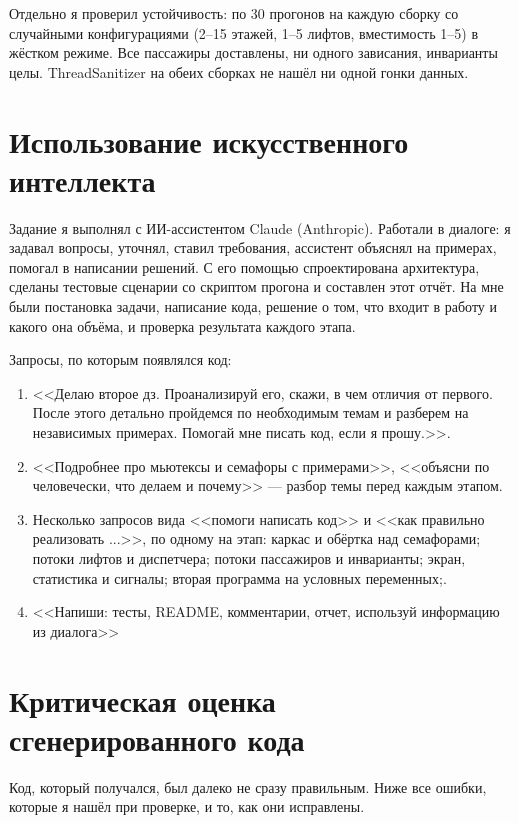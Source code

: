 \documentclass[12pt,a4paper]{article}
\begin{document}
Отдельно я проверил устойчивость: по 30 прогонов на каждую сборку со
случайными конфигурациями (2--15 этажей, 1--5 лифтов, вместимость 1--5) в
жёстком режиме. Все пассажиры доставлены, ни одного зависания, инварианты
целы. ThreadSanitizer на обеих сборках не нашёл ни одной гонки данных.

\section{Использование искусственного интеллекта}

Задание я выполнял с ИИ-ассистентом Claude (Anthropic). Работали в
диалоге: я задавал вопросы, уточнял, ставил требования, ассистент объяснял на примерах, помогал в написании решений. С его помощью спроектирована архитектура, сделаны тестовые сценарии со скриптом прогона
и составлен этот отчёт. На мне были постановка задачи, написание кода, решение о том, что входит в работу и какого она объёма, и проверка результата каждого этапа.

Запросы, по которым появлялся код:

\begin{enumerate}
\item <<Делаю второе дз. Проанализируй его, скажи, в чем отличия от первого. После этого детально пройдемся по необходимым темам и разберем на независимых примерах. Помогай мне писать код, если я прошу.>>.
\item <<Подробнее про мьютексы и семафоры с примерами>>, <<объясни по
человечески, что делаем и почему>> --- разбор темы перед каждым этапом.
\item Несколько запросов вида <<помоги написать код>> и <<как правильно реализовать ...>>, по одному на
этап: каркас и обёртка над семафорами; потоки лифтов и диспетчера; потоки
пассажиров и инварианты; экран, статистика и сигналы; вторая программа на
условных переменных;.
\item  <<Напиши: тесты, README, комментарии, отчет, используй информацию из диалога>>
\end{enumerate}

\section{Критическая оценка сгенерированного кода}

Код, который получался, был далеко не сразу правильным. Ниже все ошибки,
которые я нашёл при проверке, и то, как они исправлены.
\end{document}
